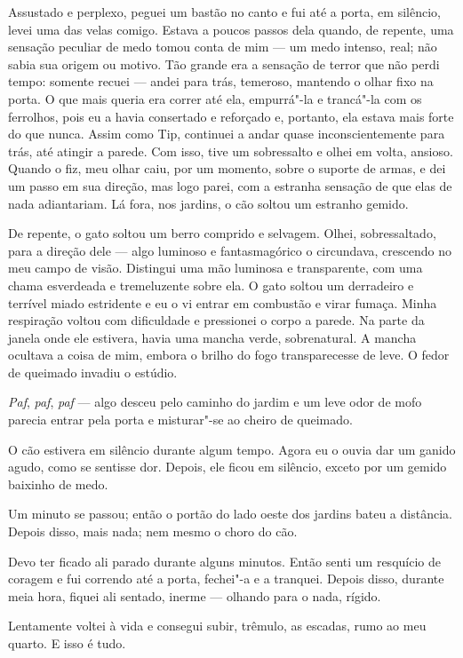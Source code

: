 Assustado e perplexo, peguei um bastão no canto e fui até a porta, em silêncio, levei uma das velas comigo. Estava a
poucos passos dela quando, de repente, uma sensação peculiar de medo tomou conta de mim --- um medo intenso, real; não
sabia sua origem ou motivo. Tão grande era a sensação de terror que não perdi tempo: somente recuei --- andei para
trás, temeroso, mantendo o olhar fixo na porta. O que mais queria era correr até ela, empurrá"-la e trancá"-la com os
ferrolhos, pois eu a havia consertado e reforçado e, portanto, ela estava mais forte do que nunca. Assim como Tip,
continuei a andar quase inconscientemente para trás, até atingir a parede. Com isso, tive um sobressalto e olhei em
volta, ansioso. Quando o fiz, meu olhar caiu, por um momento, sobre o suporte de armas, e dei um passo em sua direção,
mas logo parei, com a estranha sensação de que elas de nada adiantariam. Lá fora, nos jardins, o cão soltou um estranho
gemido.

De repente, o gato soltou um berro comprido e selvagem. Olhei, sobressaltado, para a direção dele --- algo luminoso e
fantasmagórico o circundava, crescendo no meu campo de visão. Distingui uma mão luminosa e transparente, com uma chama
esverdeada e tremeluzente sobre ela. O gato soltou um derradeiro e terrível miado estridente e eu o vi entrar em
combustão e virar fumaça. Minha respiração voltou com dificuldade e pressionei o corpo a parede. Na parte da janela
onde ele estivera, havia uma mancha verde, sobrenatural. A mancha ocultava a coisa de mim, embora o brilho do fogo
transparecesse de leve. O fedor de queimado invadiu o estúdio. 

\textit{Paf}, \textit{paf}, \textit{paf }--- algo desceu pelo caminho do jardim e um leve odor de mofo parecia entrar
pela porta e misturar"-se ao cheiro de queimado.

O cão estivera em silêncio durante algum tempo. Agora eu o ouvia dar um ganido agudo, como se sentisse
dor. Depois, ele ficou em silêncio, exceto por um gemido baixinho de medo.

Um minuto se passou; então o portão do lado oeste dos jardins bateu a distância. Depois disso, mais nada; nem mesmo o
choro do cão.

Devo ter ficado ali parado durante alguns minutos. Então senti um resquício de coragem e fui correndo até a porta,
fechei"-a e a tranquei. Depois disso, durante meia hora, fiquei ali sentado, inerme --- olhando para o nada, rígido.

Lentamente voltei à vida e consegui subir, trêmulo, as escadas, rumo ao meu quarto. E isso é tudo.


